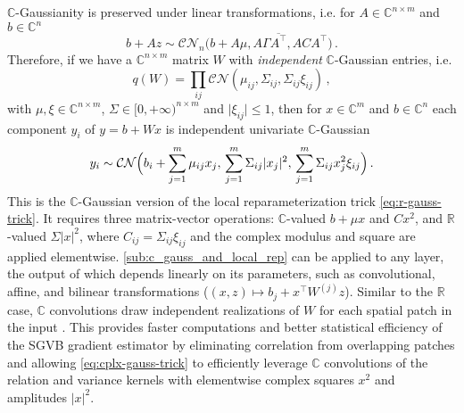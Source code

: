 \documentclass{article}
\newcommand{\real}{\mathbb{R}}
\newcommand{\cplx}{\mathbb{C}}
\newcommand{\conj}[1]{\overline{#1}}
\begin{document}
$\cplx$-Gaussianity is preserved under linear transformations, i.e. for $
  A \in \cplx^{n \times m}
$ and $b \in \cplx^{n}$
\begin{equation}  \label{eq:cn-affine}
  b + A z \sim \mathcal{C}\mathcal{N}_n\bigl(
      b + A\mu, A \Gamma \conj{A^\top}, A C A^\top
    \bigr)
  \,.
\end{equation}
Therefore, if we have a $\cplx^{n\times m}$ matrix $W$ with \emph{independent}
$\cplx$-Gaussian entries, i.e.
\begin{equation}  \label{eq:c-gauss-vi-general}
  q(W)
    = \prod_{ij} \mathcal{CN}(
      \mu_{ij}, \Sigma_{ij}, \Sigma_{ij} \xi_{ij}
    )
  \,,
\end{equation}
with $
  \mu, \xi \in \cplx^{n\times m}
$, $\Sigma \in [0, +\infty)^{n\times m}$ and $
  \lvert \xi_{ij} \rvert \leq 1
$, then for $x \in \cplx^m$ and $b \in \cplx^n$ each component $y_i$ of $y = b + W x$
is independent univariate $\cplx$-Gaussian
\begin{equation}  \label{eq:cplx-gauss-trick}
  y_i
    \sim \mathcal{C}\mathcal{N}
      \Bigl(
        b_i + \sum_{j=1}^m \mu_{ij} x_j,
        \, \sum_{j=1}^m \Sigma_{ij} \lvert x_j \rvert^2,
        \, \sum_{j=1}^m \Sigma_{ij} x_j^2 \xi_{ij}
      \Bigr)
    \,.
\end{equation}
This is the $\cplx$-Gaussian version of the local reparameterization trick \eqref{eq:r-gauss-trick}.
It requires three matrix-vector operations: $\cplx$-valued $b + \mu x$ and $C x^2$,
and $\real$-valued $
  \Sigma \lvert x \rvert^2
$, where $C_{ij} = \Sigma_{ij} \xi_{ij}$ and the complex modulus and square are applied
elementwise. \eqref{sub:c_gauss_and_local_rep} can be applied to any layer, the output
of which depends linearly on its parameters, such as convolutional, affine, and bilinear
transformations ($
  (x, z) \mapsto b_j + x^\top W^{(j)} z
$). Similar to the $\real$ case, $\cplx$ convolutions draw independent realizations of $W$
for each spatial patch in the input \citep{molchanov_variational_2017}. This provides
faster computations and better statistical efficiency of the SGVB gradient estimator
by eliminating correlation from overlapping patches \citep{kingma_variational_2015} and
allowing \eqref{eq:cplx-gauss-trick} to efficiently leverage $\cplx$ convolutions of
the relation and variance kernels with elementwise complex squares $x^2$ and amplitudes
$\lvert x \rvert^2$.
\end{document}
